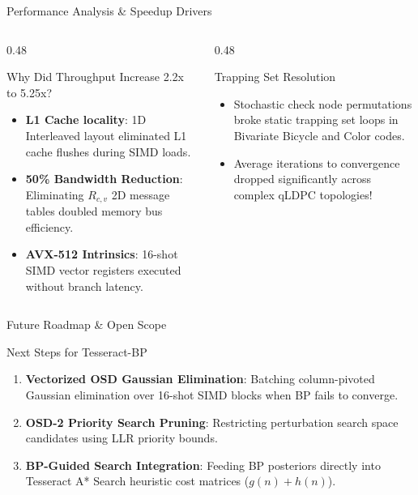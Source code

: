 \begin{frame}{Performance Analysis \& Speedup Drivers}
    \begin{columns}[T]
        \begin{column}{0.48\textwidth}
            \begin{block}{Why Did Throughput Increase 2.2x to 5.25x?}
                \begin{itemize}
                    \item \textbf{L1 Cache locality}: 1D Interleaved layout eliminated L1 cache flushes during SIMD loads.
                    \item \textbf{50\% Bandwidth Reduction}: Eliminating $R_{c,v}$ 2D message tables doubled memory bus efficiency.
                    \item \textbf{AVX-512 Intrinsics}: 16-shot SIMD vector registers executed without branch latency.
                \end{itemize}
            \end{block}
        \end{column}
        
        \begin{column}{0.48\textwidth}
            \begin{block}{Trapping Set Resolution}
                \begin{itemize}
                    \item Stochastic check node permutations broke static trapping set loops in Bivariate Bicycle and Color codes.
                    \item Average iterations to convergence dropped significantly across complex qLDPC topologies!
                \end{itemize}
            \end{block}
        \end{column}
    \end{columns}
\end{frame}

\begin{frame}{Future Roadmap \& Open Scope}
    \begin{block}{Next Steps for Tesseract-BP}
        \begin{enumerate}
            \item \textbf{Vectorized OSD Gaussian Elimination}: Batching column-pivoted Gaussian elimination over 16-shot SIMD blocks when BP fails to converge.
            \item \textbf{OSD-2 Priority Search Pruning}: Restricting perturbation search space candidates using LLR priority bounds.
            \item \textbf{BP-Guided Search Integration}: Feeding BP posteriors directly into Tesseract A* Search heuristic cost matrices ($g(n) + h(n)$).
        \end{enumerate}
    \end{block}
\end{frame}

